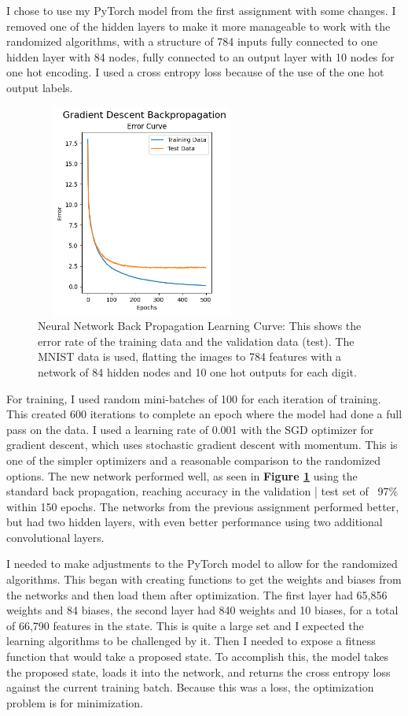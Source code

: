 \documentclass[letterpaper]{article} %
\begin{document}
I chose to use my PyTorch model from the first assignment with some changes.  I removed one of the hidden layers to make it more manageable to work with the randomized algorithms, with a structure of 784 inputs fully connected to one hidden layer with 84 nodes, fully connected to an output layer with 10 nodes for one hot encoding.  I used a cross entropy loss because of the use of the one hot output labels.


\begin{figure}[!htb]
\centering
\includegraphics[width=2.75in, height=2.75in]{figures/Gradient_Descent_Backpropagation__epoch_count_500_Error_Curve.png}
\caption{Neural Network Back Propagation Learning Curve: This shows the error rate of the training data and the validation data (test).  The MNIST data is used, flatting the images to 784 features with a network of 84 hidden nodes and 10 one hot outputs for each digit.  }
\label{fig:nn_gradient_initial}
\end{figure}

For training, I used random mini-batches of 100 for each iteration of training.  This created 600 iterations to complete an epoch where the model had done a full pass on the data.  I used a learning rate of 0.001 with the SGD optimizer for gradient descent, which uses stochastic gradient descent with momentum.  This is one of the simpler optimizers and a reasonable comparison to the randomized options. The new network performed well, as seen in  \textbf{Figure \ref{fig:nn_gradient_initial}}  using the standard back propagation, reaching accuracy in the validation | test set of ~97\% within 150 epochs.   The networks from the previous assignment performed better, but had two hidden layers, with even better performance using two additional convolutional layers. 

I needed to make adjustments to the PyTorch model to allow for the randomized algorithms. This began with creating functions to get the weights and biases from the networks and then load them after optimization.  The first layer had 65,856 weights and 84 biases, the second layer had 840 weights and 10 biases, for a total of 66,790 features in the state.  This is quite a large set and I expected the learning algorithms to be challenged by it.  Then I needed to expose a fitness function that would take a proposed state.  To accomplish this, the model takes the proposed state, loads it into the network, and returns the cross entropy loss against the current training batch.   Because this was a loss, the optimization problem is for minimization.
\end{document}
